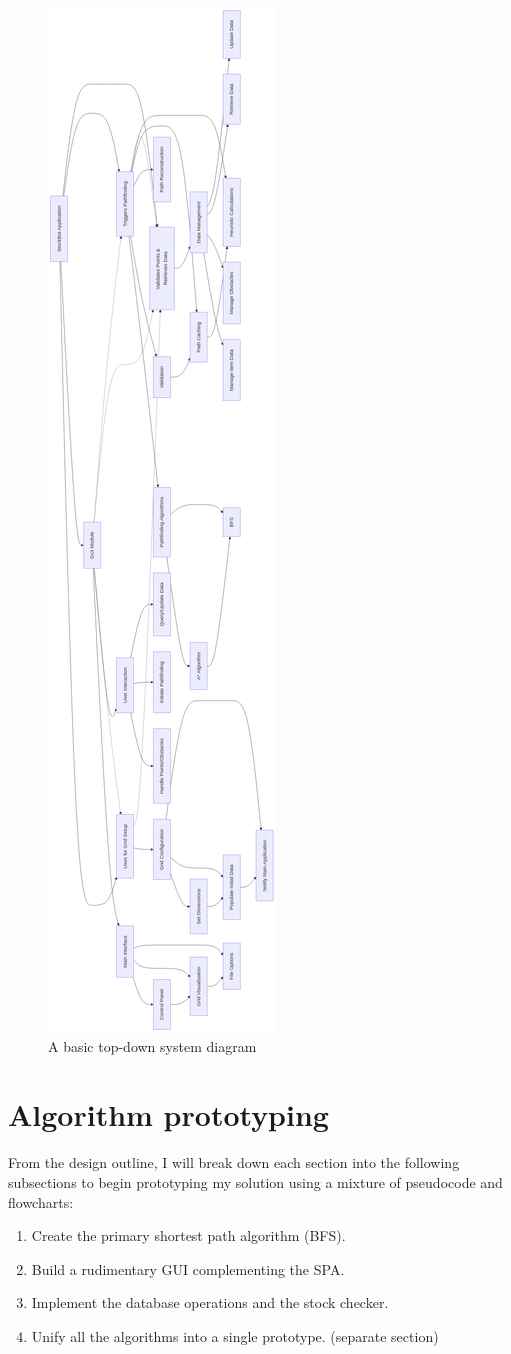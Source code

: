 \begin{figure}[!htbp]
	\centering
	\includegraphics[width=0.3\linewidth]{Images/top-down-diagram.png}
	\caption{A basic top-down system diagram}
\end{figure}


\newpage
\section{Algorithm prototyping}

From the design outline, I will break down each section into the following subsections to begin prototyping my solution using a mixture of pseudocode and flowcharts:

\begin{enumerate}
    \item Create the primary shortest path algorithm (BFS).
    \item Build a rudimentary GUI complementing the SPA.
    \item Implement the database operations and the stock checker.
    \item Unify all the algorithms into a single prototype. (separate section)
\end{enumerate}

